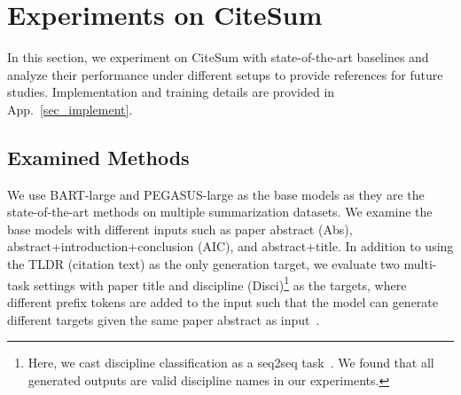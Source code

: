 \documentclass[11pt]{article}
\newcommand{\upv}{\vspace{-.0cm}}
\newcommand{\downv}{\vspace{-.1cm}}
\newcommand{\ourdata}{CiteSum\xspace}
\begin{document}
\begin{table}[ht]
\centering
{}
\upv
\caption{Ratings of citation sentences in \ourdata regarding whether they can serve as high-quality summaries of the cited papers.}
\downv
\label{table_human_eval}
\end{table}











\section{Experiments on \ourdata}
\label{sec_exp_ourdata}
In this section, we experiment on \ourdata with state-of-the-art baselines and analyze their performance under different setups to provide references for future studies.
Implementation and training details are provided in App.~\ref{sec_implement}.



\subsection{Examined Methods}
We use BART-large \cite{lewis-etal-2020-bart} and PEGASUS-large \cite{zhang2020pegasus} as the base models as they are the state-of-the-art methods on multiple summarization datasets.
We examine the base models with different inputs such as paper abstract (Abs), abstract+introduction+conclusion (AIC), and abstract+title.
In addition to using the TLDR (citation text) as the only generation target, we evaluate two multi-task settings with paper title and discipline (Disci)\footnote{Here, we cast discipline classification as a seq2seq task~\cite{mao-etal-2021-reader}. We found that all generated outputs are valid discipline names in our experiments.} as the targets, where different prefix tokens are added to the input such that the model can generate different targets given the same paper abstract as input~\cite{cachola-etal-2020-tldr}.
\end{document}
